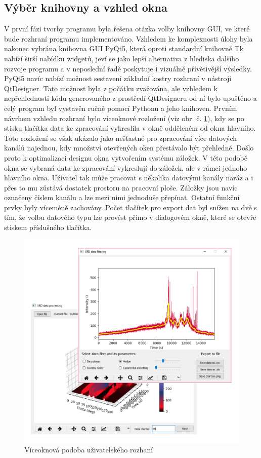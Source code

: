 \documentclass[a4paper, 12pt]{article}
\begin{document}
\subsection{Výběr knihovny a vzhled okna}
V první fázi tvorby programu byla řešena otázka volby knihovny GUI, ve které bude rozhraní programu implementováno. Vzhledem ke komplexnosti úlohy byla nakonec vybrána knihovna GUI PyQt5, která oproti standardní knihovně Tk nabízí širší nabídku widgetů, jeví se jako lepší alternativa z hlediska dalšího rozvoje programu a v neposlední řadě poskytuje i vizuálně přívětivější výsledky.
PyQt5 navíc nabízí možnost sestavení základní kostry rozhraní v nástroji QtDesigner. Tato možnost byla z počátku zvažována, ale vzhledem k nepřehlednosti kódu generovaného z prostředí QtDesigneru od ní bylo upuštěno a celý program byl vystavěn ručně pomocí Pythonu a jeho knihoven.
\vskip 0.1in
\noindent Prvním návrhem vzhledu rozhraní bylo víceoknové rozložení (viz obr. č. \ref{fig:oldwin}), kdy se po stisku tlačítka  data ke zpracování vykreslila v okně odděleném od okna hlavního. Toto rozložení se však ukázalo jako nešťastné pro zpracování více datových kanálů najednou, kdy množství otevřených oken přestávalo být přehledné. Došlo proto k optimalizaci designu okna vytvořením systému záložek. V této podobě okna se vybraná data ke zpracování vykreslují do záložek, ale v rámci jednoho hlavního okna. Uživatel tak může pracovat s několika datovými kanály naráz a i přes to mu zůstává dostatek prostoru na pracovní ploše. Záložky jsou navíc označeny číslem kanálu a lze mezi nimi jednoduše přepínat. Ostatní funkční prvky byly víceméně zachovány. Počet tlačítek pro export dat byl snížen na dvě s tím, že volbu datového typu lze provést přímo v dialogovém okně, které se otevře stiskem příslušného tlačítka.

\begin{figure}[hbt!]
 \centering
 \includegraphics[width=0.85\linewidth]{oldwin.png}
 \caption{Víceoknová podoba uživatelského rozhaní}
 \label{fig:oldwin}
\end{figure}
\end{document}
